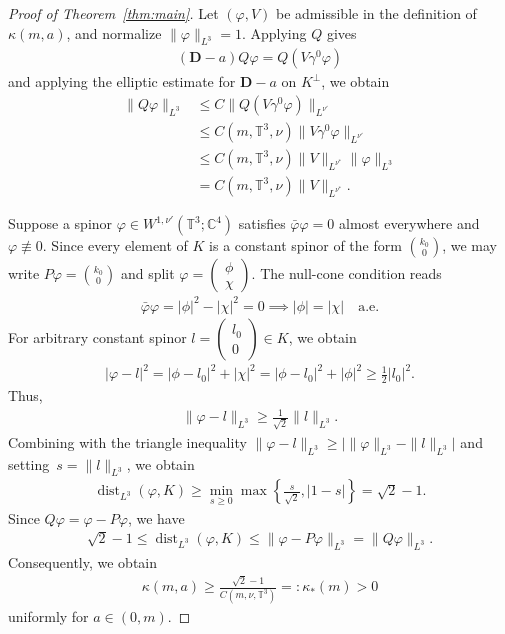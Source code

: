 \documentclass[11pt,final]{amsart}
\newcommand{\T}{\mathbb{T}}
\newcommand{\pD}{\mathbf{D}}
\begin{document}
\begin{proof}[Proof of Theorem~\ref{thm:main}]
Let $(\varphi,V)$ be admissible in the definition of $\kappa(m,a)$, and
normalize $\|\varphi\|_{L^3}=1$. Applying $Q$ gives
\begin{align}
(\pD-a)Q\varphi
=Q(V\gamma^0\varphi)
\end{align}
and applying the elliptic estimate for $\pD-a$ on $K^\perp$, we obtain
\begin{align}
\|Q\varphi\|_{L^3}
&\le C\|Q(V\gamma^0\varphi)\|_{L^{\nu'}} \\
&\le
C(m,\mathbb{T}^3,\nu)\|V\gamma^0\varphi\|_{L^{ \nu'}}\\
&\le
C(m,\mathbb{T}^3,\nu)\|V\|_{L^{\nu^*}}\|\varphi\|_{L^3}\\
&=C(m,\mathbb{T}^3,\nu)\|V\|_{L^{\nu^*}}.
\end{align}

Suppose a spinor $\varphi\in W^{1, \nu'}(\T^3;\mathbb{C}^4)$ satisfies $\bar{\varphi}\varphi=0$ almost everywhere and $\varphi\not\equiv 0$. Since every element of $K$ is a constant spinor of the form $\binom{k_0}{0}$, we may write
$P\varphi=\binom{k_0}{0}$ and split $\varphi = \begin{pmatrix}\phi\\\chi\end{pmatrix}$. The null-cone condition reads
\begin{align}
\bar{\varphi}\varphi = |\phi|^2 - |\chi|^2 = 0 \implies |\phi| = |\chi| \quad \text{a.e.}
\end{align}
For arbitrary constant spinor $l=\begin{pmatrix}
        l_0 \\ 0
    \end{pmatrix}\in K$, we obtain
\begin{align}
|\varphi - l|^2 = |\phi - l_0|^2 + |\chi|^2 = |\phi - l_0|^2 + |\phi|^2 \ge \tfrac12 |l_0|^2.
\end{align}
Thus,
\begin{align}
\|\varphi - l\|_{L^3} \ge \tfrac{1}{\sqrt{2}} \|l\|_{L^3}.
\end{align}
Combining with the triangle inequality $\|\varphi - l\|_{L^3} \ge \big|\|\varphi\|_{L^3} - \|l\|_{L^3}\big|$ and setting~$s = \|l\|_{L^3}$, we obtain
\begin{align}
\operatorname{dist}_{L^3}(\varphi,K)
\ge
\min_{s\ge0}
\max\left\{
\frac{s}{\sqrt2},|1-s|
\right\}
=\sqrt2-1.
\end{align}
Since $Q\varphi = \varphi - P\varphi$, we have
\begin{align}
\sqrt2-1
\le
\operatorname{dist}_{L^3}(\varphi,K)
\le
\|\varphi-P\varphi\|_{L^3}
=\|Q\varphi\|_{L^3}.
\end{align}
Consequently, we obtain
\begin{align}
\kappa(m,a)
\geq
\frac{\sqrt2-1}{C(m,\nu,\mathbb{T}^3)}
=:\kappa_*(m)>0
\end{align}
uniformly for $a\in(0,m)$.


\end{proof}
\end{document}
